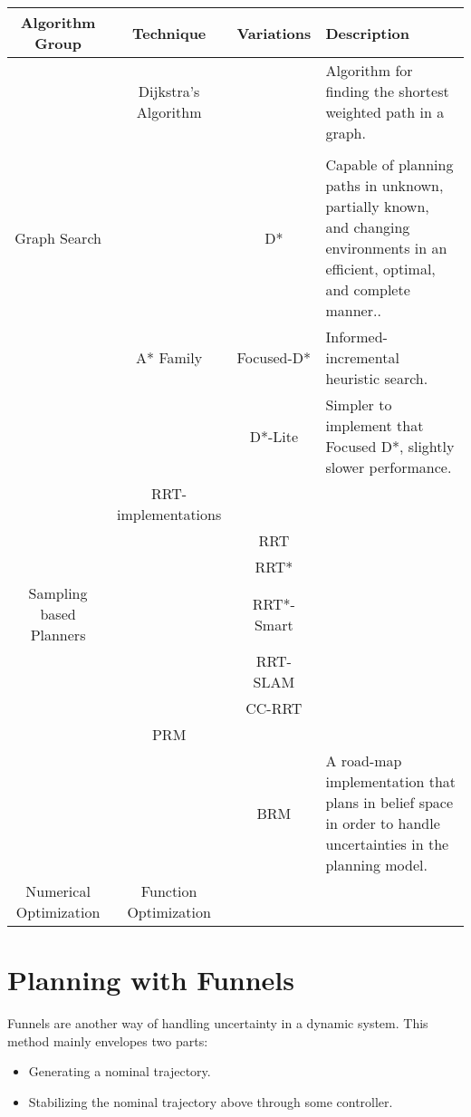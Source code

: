 \begin{table}
  \begin{tabular}{c c c p{4cm}}
    \hline
    \hline
    Algorithm Group & Technique & Variations & Description \\
    \hline
                    &  Dijkstra's Algorithm & &Algorithm for finding the shortest weighted path in a graph.\\
                    &  \\
    Graph Search               & & D* & Capable of planning paths in unknown, partially known, and changing environments in an efficient, optimal, and complete manner..\\
                    & A* Family & Focused-D* & Informed-incremental heuristic search.\\
                    & & D*-Lite & Simpler to implement that Focused D*, slightly slower performance.\\
    \hline
                    & RRT-implementations \\
                    & & RRT\\
                    & & RRT*\\
    Sampling based Planners& & RRT*-Smart\\
                    & & RRT-SLAM\\
                    & & CC-RRT\\
                    & PRM \\
                    & & BRM & A road-map implementation that plans in belief space in order to handle uncertainties in the planning model.\\
    \hline
    Numerical Optimization &  Function Optimization \\
    \hline
  \end{tabular} 
\end{table}

\section{Planning with Funnels}

Funnels are another way of handling uncertainty in a dynamic system. This method
mainly envelopes two parts:

\begin{itemize}

  \item Generating a nominal trajectory.
  \item Stabilizing the nominal trajectory above through some controller.

\end{itemize} 


